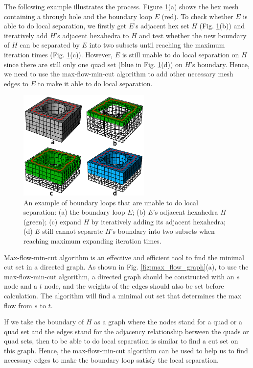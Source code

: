 \documentclass[final,5p,times,twocolumn]{elsarticle}
\begin{document}
The following example illustrates the process. Figure \ref{fig:local_sep_exam}(a) shows the hex mesh containing a through hole and the boundary loop $E$ (red). To check whether $E$ is able to do local separation, we firstly get $E$'s adjacent hex set $H$ (Fig. \ref{fig:local_sep_exam}(b)) and iteratively add $H$'s adjacent hexahedra to $H$ and test whether the new boundary of $H$ can be separated by $E$ into two subsets until reaching the maximum iteration times (Fig. \ref{fig:local_sep_exam}(c)). However, $E$ is still unable to do local separation on $H$ since there are still only one quad set (blue in Fig. \ref{fig:local_sep_exam}(d)) on $H$'s boundary. Hence, we need to use the max-flow-min-cut algorithm to add other necessary mesh edges to $E$ to make it able to do local separation.

\begin{figure}[htbp]
\begin{center}
\includegraphics[width=6.5cm]{figures/local_sep_exam.png}
\caption{An example of boundary loops that are unable to do local separation: (a) the boundary loop $E$; (b) $E$'s adjacent hexahedra $H$(green); (c) expand $H$ by iteratively adding its adjacent hexahedra; (d) $E$ still cannot separate $H$'s boundary into two subsets when reaching maximum expanding iteration times.}
\label{fig:local_sep_exam}
\end{center}
\end{figure}


Max-flow-min-cut algorithm is an effective and efficient tool to find the minimal cut set in a directed graph. As shown in Fig. \ref{fig:max_flow_graph}(a), to use the max-flow-min-cut algorithm, a directed graph should be constructed with an $s$ node and a $t$ node, and the weights of the edges should also be set before calculation. The algorithm will find a minimal cut set that determines the max flow from $s$ to $t$.

If we take the boundary of $H$ as a graph where the nodes stand for a quad or a quad set and the edges stand for the adjacency relationship between the quads or quad sets, then to be able to do local separation is similar to find a cut set on this graph. Hence, the max-flow-min-cut algorithm can be used to help us to find necessary edges to make the boundary loop satisfy the local separation.
\end{document}
